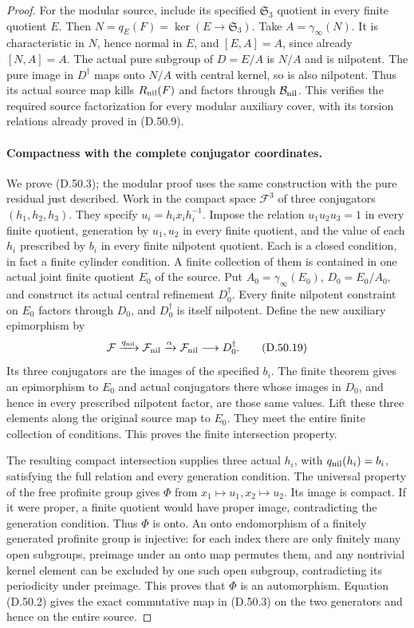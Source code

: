 \begin{proof}
For the modular source, include its specified
\(\mathfrak S_3\) quotient in every finite quotient
\(E\). Then \(N=q_E(F)=\ker(E\to\mathfrak S_3)\).
Take \(A=\gamma_\infty(N)\). It is characteristic in
\(N\), hence normal in \(E\), and
\([E,A]=A\), since already \([N,A]=A\).
The actual pure subgroup of \(D=E/A\) is \(N/A\) and
is nilpotent. The pure image in \(D^\dagger\) maps
onto \(N/A\) with central kernel, so is also nilpotent.
Thus its actual source map kills \(R_{\rm nil}(F)\)
and factors through \(\mathcal B_{\rm nil}\).
This verifies the required source factorization for
every modular auxiliary cover, with its torsion
relations already proved in \textup{(D.50.9)}.

\paragraph{Compactness with the complete conjugator coordinates.}
We prove \textup{(D.50.3)}; the modular proof uses the
same construction with the pure residual just described.
Work in the compact space \(\mathcal F^3\) of three
conjugators \((h_1,h_2,h_3)\). They specify
\(u_i=h_ix_ih_i^{-1}\).
Impose the relation \(u_1u_2u_3=1\) in every finite
quotient, generation by \(u_1,u_2\) in every finite
quotient, and the value of each \(h_i\) prescribed by
\(b_i\) in every finite nilpotent quotient.
Each is a closed condition, in fact a finite cylinder
condition. A finite collection of them is contained in
one actual joint finite quotient \(E_0\) of the source.
Put \(A_0=\gamma_\infty(E_0)\), \(D_0=E_0/A_0\), and
construct its actual central refinement \(D_0^\dagger\).
Every finite nilpotent constraint on \(E_0\) factors
through \(D_0\), and \(D_0^\dagger\) is itself
nilpotent. Define the new auxiliary epimorphism by
\[
 \mathcal F\xrightarrow{q_{\rm nil}}\mathcal F_{\rm nil}
       \xrightarrow{\alpha}\mathcal F_{\rm nil}
       \longrightarrow D_0^\dagger.
 \tag{D.50.19}
\]
Its three conjugators are the images of the specified
\(b_i\). The finite theorem gives an epimorphism to
\(E_0\) and actual conjugators there whose images in
\(D_0\), and hence in every prescribed nilpotent
factor, are those same values. Lift these three
elements along the original source map to \(E_0\).
They meet the entire finite collection of conditions.
This proves the finite intersection property.

The resulting compact intersection supplies three
actual \(h_i\), with \(q_{\rm nil}(h_i)=b_i\), satisfying
the full relation and every generation condition.
The universal property of the free profinite group gives
\(\Phi\) from \(x_1\mapsto u_1,x_2\mapsto u_2\).
Its image is compact. If it were proper, a finite
quotient would have proper image, contradicting the
generation condition. Thus \(\Phi\) is onto.
An onto endomorphism of a finitely generated profinite
group is injective: for each index there are only
finitely many open subgroups, preimage under an onto
map permutes them, and any nontrivial kernel element
can be excluded by one such open subgroup, contradicting
its periodicity under preimage. This proves that
\(\Phi\) is an automorphism.
Equation \textup{(D.50.2)} gives the exact commutative
map in \textup{(D.50.3)} on the two generators and
hence on the entire source.


\end{proof}
